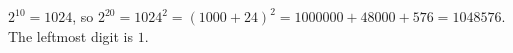 $ 2^{10}=1024 $, so $ 2^{20}=1024^2=(1000+24)^2=1000000+48000+576=1048576 $. The leftmost digit is $\boxed1 $.
